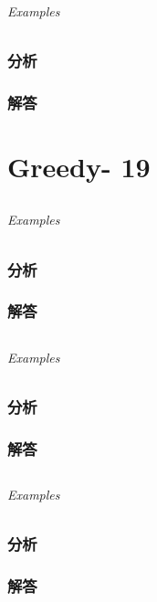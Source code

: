 \documentclass[UTF8,a4paper,12pt]{ctexbook}
\begin{document}
	\subparagraph{Examples}
	
	\subsection{分析}
	
	\subsection{解答}
\chapter{Greedy- 19}
\section{}
	
	\subparagraph{Examples}
	
	\subsection{分析}
	
	\subsection{解答}
	
\section{}
	
	\subparagraph{Examples}
	
	\subsection{分析}
	
	\subsection{解答}
	
\section{}
	
	\subparagraph{Examples}
	
	\subsection{分析}
	
	\subsection{解答}
	
\end{document}

